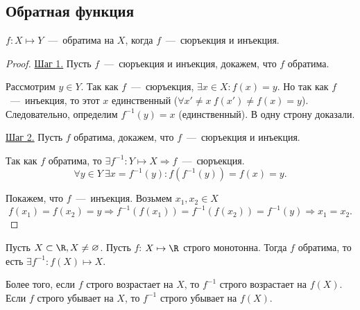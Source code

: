 \subsection{Обратная функция}

\begin{lemma}
    $f: X \mapsto Y$~---~обратима на $X$, когда $f$~---~сюръекция и инъекция.
\end{lemma}
\begin{proof}
    
    \underline{Шаг 1.} Пусть $f$~---~сюръекция и инъекция, докажем, что $f$ обратима. 
    
    Рассмотрим $y \in Y$. Так как $f$~---~сюръекция, $\exists x\in X: f(x) = y.$ Но так как $f$~---~инъекция, то этот $x$ единственный ($\forall x' \neq x \ f(x') \neq f(x) = y$). Следовательно, определим $f^{-1}(y) = x$ (единственный). В одну строну доказали.

    \underline{Шаг 2.} Пусть $f$ обратима, докажем, что $f$~---~сюръекция и инъекция.

    Так как $f$ обратима, то $\exists f^{-1}: Y \mapsto X \Rightarrow f$~---~сюръекция.
    $$\forall y \in Y \ \exists x = f^{-1}(y): f(f^{-1}(y)) = f(x) = y.$$

    Покажем, что $f$~---~инъекция. Возьмем $x_{1}, x_{2} \in X$
    $$ f(x_{1}) = f(x_{2}) = y \Rightarrow f^{-1}(f(x_{1})) = f^{-1}(f(x_{2})) = f^{-1}(y) \Rightarrow x_{1} = x_{2}.
    $$
\end{proof}

\begin{lemma}
    \hypertarget{lemm4.9}{Пусть $X \subset \R, X \neq \varnothing$. Пусть $f$: $X \mapsto \R$ строго монотонна. Тогда $f$ обратима, то есть $\exists f^{-1}: f(X) \mapsto X.$}

    Более того, если $f$ строго возрастает на $X$, то $f^{-1}$ строго возрастает на $f(X)$. Если $f$ строго убывает на $X$, то $f^{-1}$ строго убывает на $f(X)$.
\end{lemma}

